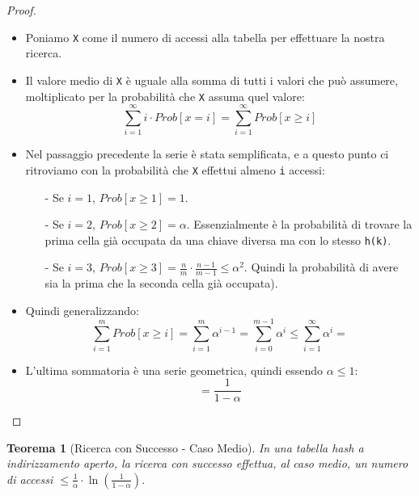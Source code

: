 \documentclass{article}
\newtheorem{theorem}{Teorema}[section]
\begin{document}
\begin{proof}
    $ $\newline
    \begin{itemize}
        \item Poniamo \verb|X| come il numero di accessi alla tabella per effettuare la nostra ricerca.
        \item Il valore medio di \verb|X| è uguale alla somma di tutti i valori che può assumere, moltiplicato per la probabilità che \verb|X| assuma quel valore:
            \begin{equation*}
                \sum_{i = 1}^{\infty} i \cdot Prob[x = i] = \sum_{i = 1}^{\infty} Prob[x \geq i]
            \end{equation*}
        \item Nel passaggio precedente la serie è stata semplificata, e a questo punto ci ritroviamo con la probabilità che \verb|X| effettui almeno \verb|i| accessi:
            \begin{itemize}
                \item[-] Se $i = 1$, $Prob[x \geq 1] = 1$.
                \item[-] Se $i = 2$, $Prob[x \geq 2] = \alpha$. Essenzialmente è la probabilità di trovare la prima cella già occupata da una chiave diversa ma con lo stesso \verb|h(k)|.
                \item[-] Se $i = 3$, $Prob[x \geq 3] = \frac{n}{m} \cdot \frac{n - 1}{m - 1} \leq \alpha^2$. Quindi la probabilità di avere sia la prima che la seconda cella già occupata).
            \end{itemize}
        \item Quindi generalizzando:
            \begin{equation*}
                \sum_{i = 1}^{m} Prob[x \geq i] = \sum_{i = 1}^{m} \alpha^{i - 1} = \sum_{i = 0}^{m - 1} \alpha^i \leq \sum_{i = 1}^{\infty} \alpha^i =
            \end{equation*}
        \item L'ultima sommatoria è una serie geometrica, quindi essendo $\alpha \leq 1$:
            \begin{equation*}
                = \frac{1}{1 - \alpha}
            \end{equation*}
    \end{itemize}
\end{proof}

\begin{theorem}[Ricerca con Successo - Caso Medio]
    In una tabella hash a indirizzamento aperto, la ricerca con successo effettua, al caso medio, un numero di accessi $\leq \frac{1}{\alpha} \cdot \ln(\frac{1}{1 - \alpha})$.
\end{theorem}
\end{document}
